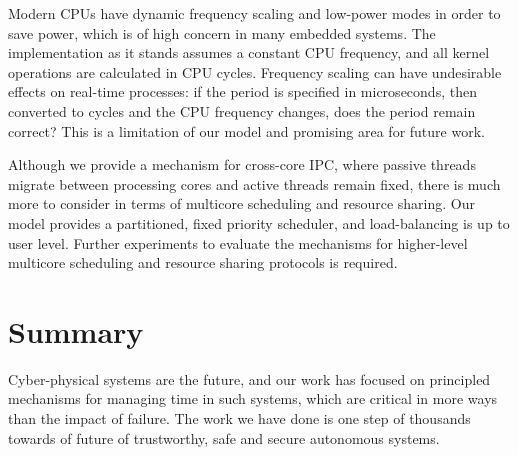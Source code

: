 Modern \glspl{CPU} have dynamic frequency scaling and low-power modes in order to save power, which
is of high concern in many embedded systems. The implementation as it stands assumes a constant
\gls{CPU} frequency, and all kernel operations are calculated in \gls{CPU} cycles. Frequency scaling
can have undesirable effects on real-time processes: if the period is specified in microseconds, then
converted to cycles and the CPU frequency changes, does the period remain correct? This is a
limitation of our model and promising area for future work.

Although we provide a mechanism for cross-core IPC, where passive threads migrate between processing
cores and active threads remain fixed, there is much more to consider in terms of multicore
scheduling and resource sharing. Our model provides a partitioned, fixed priority scheduler, and 
load-balancing is up to user level. Further experiments to evaluate the mechanisms for higher-level
multicore scheduling and resource sharing protocols is required. 
                
\section{Summary}

Cyber-physical systems are the future, and our work has focused on principled mechanisms for
managing time in such systems, which are critical in more ways than the impact of failure. The work
we have done is one step of thousands towards of future of trustworthy, safe and secure
autonomous systems. 
